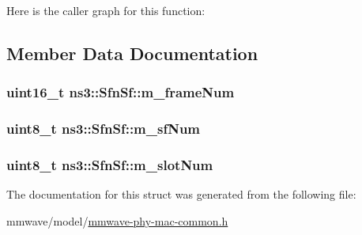 Here is the caller graph for this function\+:




\subsection{Member Data Documentation}
\subsubsection[{\texorpdfstring{m\+\_\+frame\+Num}{m_frameNum}}]{\setlength{\rightskip}{0pt plus 5cm}uint16\+\_\+t ns3\+::\+Sfn\+Sf\+::m\+\_\+frame\+Num}\hypertarget{structns3_1_1SfnSf_a28d741175c84feef9a47c8d8bd60b9bf}{}\label{structns3_1_1SfnSf_a28d741175c84feef9a47c8d8bd60b9bf}
\subsubsection[{\texorpdfstring{m\+\_\+sf\+Num}{m_sfNum}}]{\setlength{\rightskip}{0pt plus 5cm}uint8\+\_\+t ns3\+::\+Sfn\+Sf\+::m\+\_\+sf\+Num}\hypertarget{structns3_1_1SfnSf_a501403661892f4c9bf1d40ef088f3f36}{}\label{structns3_1_1SfnSf_a501403661892f4c9bf1d40ef088f3f36}
\subsubsection[{\texorpdfstring{m\+\_\+slot\+Num}{m_slotNum}}]{\setlength{\rightskip}{0pt plus 5cm}uint8\+\_\+t ns3\+::\+Sfn\+Sf\+::m\+\_\+slot\+Num}\hypertarget{structns3_1_1SfnSf_ab4c1dad7c6e986c1c45a8cc723af9745}{}\label{structns3_1_1SfnSf_ab4c1dad7c6e986c1c45a8cc723af9745}


The documentation for this struct was generated from the following file\+:\begin{DoxyCompactItemize}
\item 
mmwave/model/\hyperlink{mmwave-phy-mac-common_8h}{mmwave-\/phy-\/mac-\/common.\+h}\end{DoxyCompactItemize}
